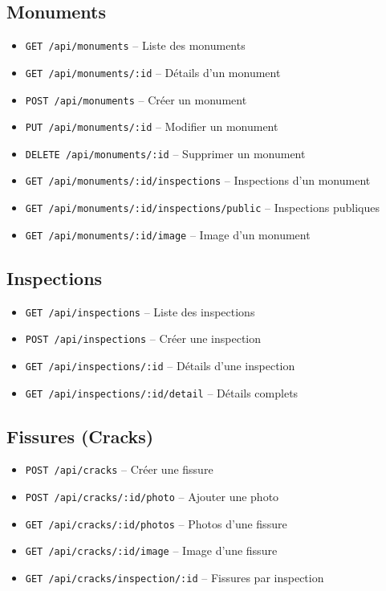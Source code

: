 \documentclass[12pt,a4paper]{article}
\begin{document}
\subsection{Monuments}
\begin{itemize}
    \item \texttt{GET /api/monuments} -- Liste des monuments
    \item \texttt{GET /api/monuments/:id} -- Détails d'un monument
    \item \texttt{POST /api/monuments} -- Créer un monument
    \item \texttt{PUT /api/monuments/:id} -- Modifier un monument
    \item \texttt{DELETE /api/monuments/:id} -- Supprimer un monument
    \item \texttt{GET /api/monuments/:id/inspections} -- Inspections d'un monument
    \item \texttt{GET /api/monuments/:id/inspections/public} -- Inspections publiques
    \item \texttt{GET /api/monuments/:id/image} -- Image d'un monument
\end{itemize}

\subsection{Inspections}
\begin{itemize}
    \item \texttt{GET /api/inspections} -- Liste des inspections
    \item \texttt{POST /api/inspections} -- Créer une inspection
    \item \texttt{GET /api/inspections/:id} -- Détails d'une inspection
    \item \texttt{GET /api/inspections/:id/detail} -- Détails complets
\end{itemize}

\subsection{Fissures (Cracks)}
\begin{itemize}
    \item \texttt{POST /api/cracks} -- Créer une fissure
    \item \texttt{POST /api/cracks/:id/photo} -- Ajouter une photo
    \item \texttt{GET /api/cracks/:id/photos} -- Photos d'une fissure
    \item \texttt{GET /api/cracks/:id/image} -- Image d'une fissure
    \item \texttt{GET /api/cracks/inspection/:id} -- Fissures par inspection
\end{itemize}
\end{document}
